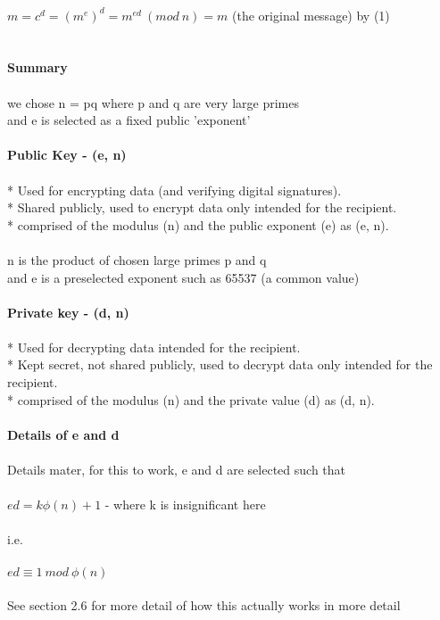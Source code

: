 \documentclass[11pt]{article}   	%
\begin{document}
\\
$ m = c^d = (m^e)^d = m^{ed} \ (mod \ n) = m$ (the original message) by (1) \\
\\
\break 
\\
\textbf{Summary} \\
\\
we chose n = pq where p and q are very large primes \\
and e is selected as a fixed public 'exponent' \\
\\
\textbf{Public Key - (e, n)} \\
\\
    * Used for encrypting data (and verifying digital signatures). \\
    * Shared publicly, used to encrypt data only intended for the recipient. \\
    * comprised of the modulus (n) and the public exponent (e) as (e, n). \\
\\
n is the product of chosen large primes p and q \\
and e is a preselected exponent such as 65537 (a common value) \\
\\
\textbf{Private key - (d, n)} \\
\\
    * Used for decrypting data intended for the recipient. \\
    * Kept secret, not shared publicly, used to decrypt data only intended for the recipient. \\
    * comprised of the modulus (n) and the private value (d) as (d, n). \\
\\
\textbf{Details of e and d} \\
\\
Details mater, for this to work, e and d are selected such that \\
\\
$ ed = k\phi(n) + 1 $ - where k is insignificant here \\
\\
i.e. \\
\\
$ ed \equiv 1 \  mod \ \phi(n) $ \\
\\
See section 2.6 for more detail of how this actually works in more detail \\
\\
\end{document}

